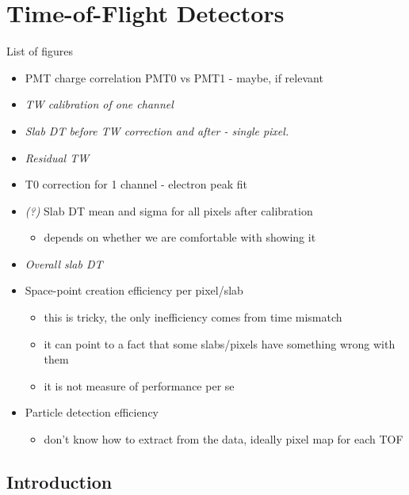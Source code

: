 \graphicspath{{02-TOF/Figures/}}


\newcommand{\mchange}[2]{{\color{red}#1}{\color{green}#2}}
\newcommand{\malert}[1]{{\it\color{red}#1}}
\newcommand{\hilite}[1]{{\it\color{blue}#1}}


\section{Time-of-Flight Detectors}
\label{Sect:TOF}

List of figures
\begin{itemize}
\item PMT charge correlation PMT0 vs PMT1 - maybe, if relevant
\item \hilite{TW calibration of one channel}
\item \hilite{Slab DT before TW correction and after - single pixel.}
\item \hilite{Residual TW}
\item T0 correction for 1 channel - electron peak fit
\item \malert{(?)} Slab DT mean and sigma for all pixels after
  calibration
  \begin{itemize} \it
  \item depends on whether we are comfortable with showing it
  \end{itemize}
\item \hilite{Overall slab DT}
\item Space-point creation efficiency per pixel/slab
  \begin{itemize}\it
  \item this is tricky, the only inefficiency comes from time mismatch
  \item it can point to a fact that some slabs/pixels have something
    wrong with them
  \item it is not measure of performance per se
  \end{itemize}
\item Particle detection efficiency
  \begin{itemize} \it
  \item don't know how to extract from the data, ideally pixel map for
    each TOF
  \end{itemize}

\end{itemize}


\subsection{Introduction}
\label{SubSect:TOF_Intro}

